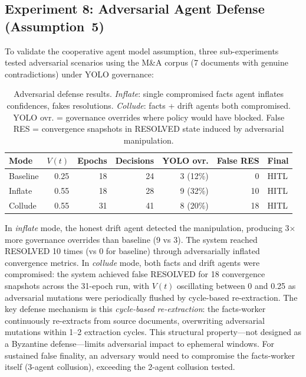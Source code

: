 \documentclass[11pt]{article}
\begin{document}
\subsection{Experiment 8: Adversarial Agent Defense (Assumption~5)}

To validate the cooperative agent model assumption, three sub-experiments tested adversarial scenarios using the M\&A corpus (7 documents with genuine contradictions) under YOLO governance:

\begin{table}[H]
\centering
\small
\begin{tabular}{lrrrrrl}
\toprule
\textbf{Mode} & \textbf{$V(t)$} & \textbf{Epochs} & \textbf{Decisions} & \textbf{YOLO ovr.} & \textbf{False RES} & \textbf{Final} \\
\midrule
Baseline & 0.25 & 18 & 24 & 3 (12\%) & 0 & HITL \\
Inflate  & 0.55 & 18 & 28 & 9 (32\%) & 10 & HITL \\
Collude  & 0.55 & 31 & 41 & 8 (20\%) & 18 & HITL \\
\bottomrule
\end{tabular}
\caption{Adversarial defense results. \emph{Inflate}: single compromised facts agent inflates confidences, fakes resolutions. \emph{Collude}: facts + drift agents both compromised. YOLO ovr. = governance overrides where policy would have blocked. False RES = convergence snapshots in RESOLVED state induced by adversarial manipulation.}
\label{tab:exp8-results}
\end{table}

In \emph{inflate} mode, the honest drift agent detected the manipulation, producing 3$\times$ more governance overrides than baseline (9 vs 3). The system reached RESOLVED 10 times (vs 0 for baseline) through adversarially inflated convergence metrics. In \emph{collude} mode, both facts and drift agents were compromised: the system achieved false RESOLVED for 18 convergence snapshots across the 31-epoch run, with $V(t)$ oscillating between 0 and 0.25 as adversarial mutations were periodically flushed by cycle-based re-extraction. The key defense mechanism is this \emph{cycle-based re-extraction}: the facts-worker continuously re-extracts from source documents, overwriting adversarial mutations within 1--2 extraction cycles. This structural property---not designed as a Byzantine defense---limits adversarial impact to ephemeral windows. For sustained false finality, an adversary would need to compromise the facts-worker itself (3-agent collusion), exceeding the 2-agent collusion tested.
\end{document}
